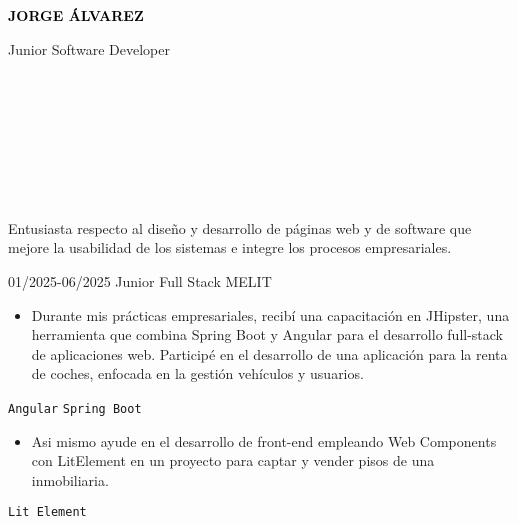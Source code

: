 \documentclass[9pt]{./src/developercv} %
\begin{document}
\begin{minipage}[t]{0.5\textwidth}
	\vspace{-\baselineskip}
	{ \fontsize{16}{20} \textcolor{black}{\textbf{\MakeUppercase{Jorge Álvarez}}}}
	\vspace{6pt}

	{\Large Junior Software Developer}
\end{minipage}
\begin{minipage}[t]{0.2\textwidth}
	\vspace{-\baselineskip}
	\\
	\\
	\\
\end{minipage}
\begin{minipage}[t]{0.3\textwidth}
	\vspace{-\baselineskip}
	\\
	\\
	\\
\end{minipage}

\begin{minipage}[t]{\textwidth}
	\vspace{-6pt}

	Entusiasta respecto al diseño y desarrollo de páginas
	web y de software que mejore la usabilidad de los sistemas
	e integre los procesos empresariales.
\end{minipage}
\hfill

\vspace{4 pt}
\begin{entrylist}
	\entry
	{01/2025-06/2025}
	{Junior Full Stack}
	{MELIT}
	{\vspace{-10pt}
		\begin{itemize}[noitemsep,topsep=0pt,parsep=0pt,partopsep=0pt, leftmargin=-1pt]
			\item {Durante mis prácticas empresariales, recibí una capacitación en JHipster, una herramienta que combina Spring Boot y Angular para el desarrollo full-stack de aplicaciones web. Participé en el desarrollo de una aplicación para la renta de coches, enfocada en la gestión vehículos y usuarios.}
		\end{itemize}
		\texttt{Angular} \slashsep \texttt{Spring Boot}
	\vspace{2 pt}
		\begin{itemize}[noitemsep,topsep=0pt,parsep=0pt,partopsep=0pt, leftmargin=-1pt]
			\item {Asi mismo ayude en el desarrollo de front-end empleando Web Components con LitElement en un proyecto para captar y vender pisos de una inmobiliaria.}
		\end{itemize}
		\texttt{Lit Element}}
\end{entrylist}
\end{document}
